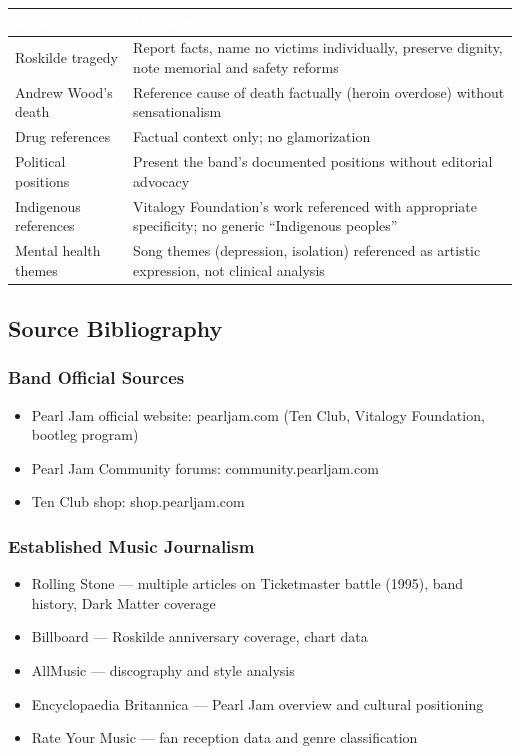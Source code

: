 \documentclass[11pt,letterpaper]{article}
\newcommand{\tableheader}[1]{\textbf{\sffamily\textcolor{white}{#1}}}
\begin{document}
\begin{center}
\begin{tabularx}{\textwidth}{L{3.5cm}X}
\toprule
{}
\tableheader{Area} & \tableheader{Handling} \\
\midrule
Roskilde tragedy & Report facts, name no victims individually, preserve dignity, note memorial and safety reforms \\
Andrew Wood's death & Reference cause of death factually (heroin overdose) without sensationalism \\
Drug references & Factual context only; no glamorization \\
Political positions & Present the band's documented positions without editorial advocacy \\
Indigenous references & Vitalogy Foundation's work referenced with appropriate specificity; no generic ``Indigenous peoples'' \\
Mental health themes & Song themes (depression, isolation) referenced as artistic expression, not clinical analysis \\
\bottomrule
\end{tabularx}
\end{center}

\subsection{Source Bibliography}

\subsubsection{Band Official Sources}
\begin{itemize}[leftmargin=2em]
\item Pearl Jam official website: pearljam.com (Ten Club, Vitalogy Foundation, bootleg program)
\item Pearl Jam Community forums: community.pearljam.com
\item Ten Club shop: shop.pearljam.com
\end{itemize}

\subsubsection{Established Music Journalism}
\begin{itemize}[leftmargin=2em]
\item Rolling Stone --- multiple articles on Ticketmaster battle (1995), band history, Dark Matter coverage
\item Billboard --- Roskilde anniversary coverage, chart data
\item AllMusic --- discography and style analysis
\item Encyclopaedia Britannica --- Pearl Jam overview and cultural positioning
\item Rate Your Music --- fan reception data and genre classification
\end{itemize}
\end{document}
